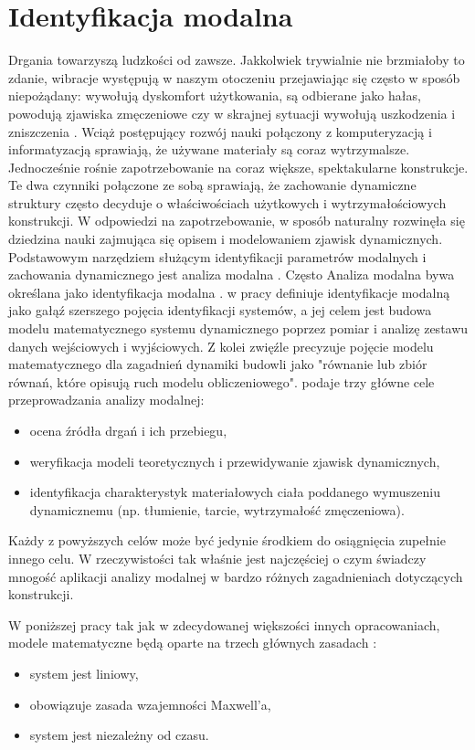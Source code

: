 \chapter{Identyfikacja modalna}

Drgania towarzyszą ludzkości od zawsze. Jakkolwiek trywialnie nie brzmiałoby to zdanie, wibracje występują w naszym otoczeniu przejawiając się często w sposób niepożądany: wywołują dyskomfort użytkowania, są odbierane jako hałas, powodują zjawiska zmęczeniowe czy w skrajnej sytuacji wywołują uszkodzenia i zniszczenia \parencite{Maia1997}. Wciąż postępujący rozwój nauki połączony z komputeryzacją i informatyzacją sprawiają, że używane materiały są coraz wytrzymalsze. Jednocześnie rośnie zapotrzebowanie na coraz większe, spektakularne konstrukcje. Te dwa czynniki połączone ze sobą sprawiają, że zachowanie dynamiczne struktury często decyduje o właściwościach użytkowych i wytrzymałościowych konstrukcji. W odpowiedzi na zapotrzebowanie, w sposób naturalny rozwinęła się dziedzina nauki zajmująca się opisem i modelowaniem zjawisk dynamicznych. Podstawowym narzędziem służącym identyfikacji parametrów modalnych i zachowania dynamicznego jest analiza modalna . Często Analiza modalna bywa określana jako identyfikacja modalna . \parencite{Zhang2004} w pracy definiuje identyfikacje modalną jako gałąź szerszego pojęcia identyfikacji systemów, a jej celem jest budowa modelu matematycznego systemu dynamicznego poprzez pomiar i analizę zestawu danych wejściowych i wyjściowych. Z kolei \cite{Chmielewski1998} zwięźle precyzuje pojęcie modelu matematycznego dla zagadnień dynamiki budowli jako "równanie lub zbiór równań, które opisują ruch modelu obliczeniowego". \cite{Ewins2000} podaje trzy główne cele przeprowadzania analizy modalnej:
\begin{itemize}
	\item ocena źródła drgań i ich przebiegu,
	\item weryfikacja modeli teoretycznych i przewidywanie zjawisk dynamicznych,
	\item identyfikacja charakterystyk materiałowych ciała poddanego wymuszeniu dynamicznemu (np. tłumienie, tarcie, wytrzymałość zmęczeniowa). 
\end{itemize}
Każdy z powyższych celów może być jedynie środkiem do osiągnięcia zupełnie innego celu. W rzeczywistości tak właśnie jest najczęściej o czym świadczy mnogość aplikacji analizy modalnej w bardzo różnych zagadnieniach dotyczących konstrukcji.

W poniższej pracy tak jak w zdecydowanej większości innych opracowaniach, modele matematyczne będą oparte na trzech głównych zasadach \parencite{Maia1997}:
\begin{itemize}
	\item system jest liniowy,
	\item obowiązuje zasada wzajemności Maxwell'a,
	\item system jest niezależny od czasu.
\end{itemize}


